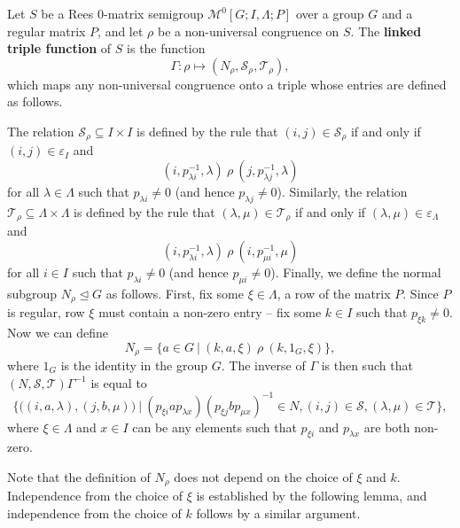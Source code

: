 \begin{definition}
  \label{def:linked-triple-function}
  Let $S$ be a Rees 0-matrix semigroup $\mathcal{M}^0[G;I,\Lambda;P]$ over a
  group $G$ and a regular matrix $P$, and let $\rho$ be a non-universal
  congruence on $S$.
  The \textbf{linked triple function} of $S$ is the function
  $$\Gamma: \rho \mapsto (N_\rho, \mathcal{S}_\rho, \mathcal{T}_\rho),$$
  which maps any non-universal congruence onto a triple whose entries are
  defined as follows.

  The relation $\mathcal{S}_\rho \subseteq I \times I$ is defined by the rule that
  $(i,j) \in \mathcal{S}_\rho$ if and only if $(i,j) \in \varepsilon_I$ and
  $$(i, p_{\lambda i}^{-1}, \lambda) ~\rho~ (j, p_{\lambda j}^{-1}, \lambda)$$
  for all $\lambda \in \Lambda$ such that $p_{\lambda i} \neq 0$ (and hence
  $p_{\lambda j} \neq 0$).  Similarly, the relation
  $\mathcal{T}_\rho \subseteq \Lambda \times \Lambda$ is defined by the rule that
  $(\lambda,\mu) \in \mathcal{T}_\rho$ if and only if
  $(\lambda,\mu) \in \varepsilon_\Lambda$ and
  $$(i, p_{\lambda i}^{-1}, \lambda) ~\rho~ (i, p_{\mu i}^{-1}, \mu)$$
  for all $i \in I$ such that $p_{\lambda i} \neq 0$ (and hence
  $p_{\mu i} \neq 0$).  Finally, we define the normal subgroup
  $N_\rho \trianglelefteq G$ as follows.  First, fix some $\xi \in \Lambda$, a
  row of the matrix $P$.  Since $P$ is regular, row $\xi$ must contain a
  non-zero entry -- fix some $k \in I$ such that $p_{\xi k} \neq 0$.  Now we can
  define
  $$N_\rho = \{a \in G ~|~ (k, a, \xi) ~\rho~ (k, 1_G, \xi)\},$$
  where $1_G$ is the identity in the group $G$.
  The inverse of $\Gamma$ is then such that
  $(N, \mathcal{S}, \mathcal{T})\Gamma^{-1}$ is equal to
  $$\Big\{
  \big((i, a, \lambda), (j, b, \mu)\big) ~\Big|~
  (p_{\xi i} a p_{\lambda x}) (p_{\xi j} b p_{\mu x})^{-1} \in N,
  (i,j) \in \mathcal{S},
  (\lambda,\mu) \in \mathcal{T}
  \Big\},$$
  where $\xi \in \Lambda$ and $x \in I$ can be any elements such that
  $p_{\xi i}$ and $p_{\lambda x}$ are both non-zero.
\end{definition}

Note that the definition of $N_\rho$ does not depend on the choice of $\xi$ and
$k$.  Independence from the choice of $\xi$ is established by the following
lemma, and independence from the choice of $k$ follows by a similar argument.

